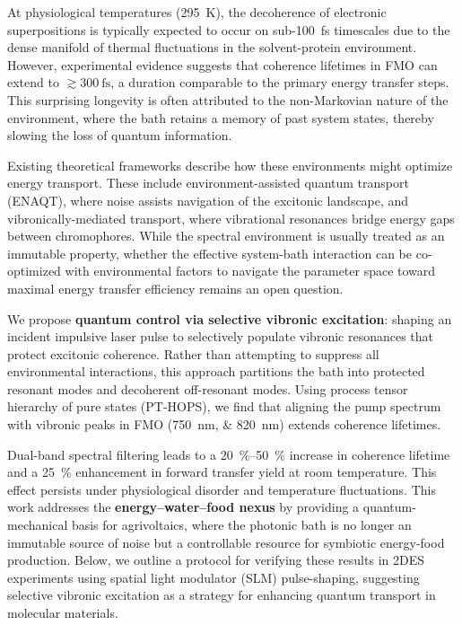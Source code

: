 \documentclass[journal=jpcl,manuscript=letter]{achemso}
\begin{document}
At physiological temperatures (\SI{295}{\kelvin}), the decoherence of electronic superpositions is typically expected to occur on sub-\SI{100}{\femto\second} timescales due to the dense manifold of thermal fluctuations in the solvent-protein environment. However, experimental evidence suggests that coherence lifetimes in FMO can extend to $\gtrsim \SI{300}{\femto\second}$, a duration comparable to the primary energy transfer steps.\cite{Engel2007,Hildner2013} This surprising longevity is often attributed to the non-Markovian nature of the environment, where the bath retains a memory of past system states, thereby slowing the loss of quantum information.\cite{Tanimura1989,Suess2014}

Existing theoretical frameworks describe how these environments might optimize energy transport. These include environment-assisted quantum transport (ENAQT), where noise assists navigation of the excitonic landscape,\cite{Mohseni2008,Rebentrost2009NJP,Plenio2010NJP,Wu2010NewJPhys} and vibronically-mediated transport, where vibrational resonances bridge energy gaps between chromophores.\cite{Chin2013,Huelga2013} While the spectral environment is usually treated as an immutable property, whether the effective system-bath interaction can be co-optimized with environmental factors to navigate the parameter space toward maximal energy transfer efficiency remains an open question.

We propose \textbf{quantum control via selective vibronic excitation}: shaping an incident impulsive laser pulse to selectively populate vibronic resonances that protect excitonic coherence. Rather than attempting to suppress all environmental interactions, this approach partitions the bath into protected resonant modes and decoherent off-resonant modes. Using process tensor hierarchy of pure states (PT-HOPS),\cite{Citty2024a} we find that aligning the pump spectrum with vibronic peaks in FMO (\SIlist{750;820}{\nano\meter}) extends coherence lifetimes.

Dual-band spectral filtering leads to a \SIrange{20}{50}{\percent} increase in coherence lifetime and a \SI{25}{\percent} enhancement in forward transfer yield at room temperature. This effect persists under physiological disorder and temperature fluctuations. This work addresses the \textbf{energy--water--food nexus} by providing a quantum-mechanical basis for agrivoltaics, where the photonic bath is no longer an immutable source of noise but a controllable resource for symbiotic energy-food production. Below, we outline a protocol for verifying these results in 2DES experiments using spatial light modulator (SLM) pulse-shaping, suggesting selective vibronic excitation as a strategy for enhancing quantum transport in molecular materials.
\end{document}
